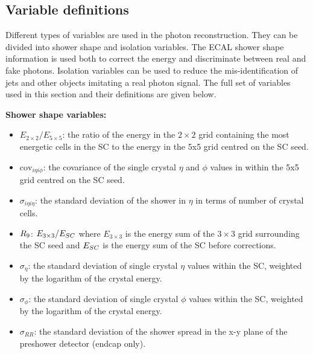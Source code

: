 \subsection{Variable definitions}

Different types of variables are used in the photon reconstruction.
They can be divided into shower shape and isolation variables.
The ECAL shower shape information is used both to correct the energy and discriminate between real and fake photons.
Isolation variables can be used to reduce the mis-identification of jets and other objects imitating a real photon signal.
The full set of variables used in this section and their definitions are given below.

\newpage

\textbf{Shower shape variables:}
\begin{itemize}[noitemsep]
  \item \emph{$E_{2\times2}/E_{5\times5}$}: the ratio of the energy in the $2\times2$ grid
    containing the most energetic cells in the SC to the energy in
    the 5x5 grid centred on the SC seed.
  \item \emph{$\textrm{cov}_{i\eta i\phi}$}: the covariance of the single crystal $\eta$
    and $\phi$ values in within the 5x5 grid centred on the
    SC seed.
  \item \emph{$\sigma_{i\eta i\eta}$}: the standard deviation of the 
    shower in $\eta$ in terms of number of crystal cells. 
  \item \emph{$R_9$}: $E_{3\times3}/E_{SC}$ where $E_{3\times3}$ is the energy sum of the
    $3\times3$ grid surrounding the SC seed and $E_{SC}$ is the energy sum of the SC before corrections. 
  \item \emph{$\sigma_{\eta}$}: the standard deviation
    of single crystal $\eta$ values within the SC, weighted by the logarithm of the crystal energy.
  \item \emph{$\sigma_{\phi}$}: the standard deviation
    of single crystal $\phi$ values within the SC, weighted by the logarithm of the crystal energy.
  \item \emph{$\sigma_{RR}$}: the standard deviation of the shower
    spread in the x-y plane of the preshower detector (endcap only).
\end{itemize}

